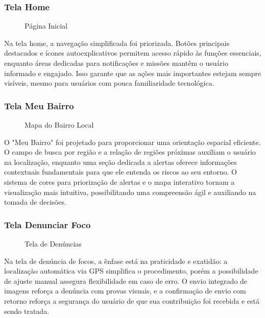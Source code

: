 \documentclass[a5paper, 12pt]{article}
\begin{document}
\subsubsection{Tela Home}

\begin{figure}[H]
  \centering
  \caption{Página Inicial}
  \label{fig:home}
\end{figure}

Na tela home, a navegação simplificada foi priorizada. Botões principais destacados e ícones autoexplicativos permitem acesso rápido às funções essenciais, enquanto áreas dedicadas para notificações e missões mantêm o usuário informado e engajado. Isso garante que as ações mais importantes estejam sempre visíveis, mesmo para usuários com pouca familiaridade tecnológica.

\subsubsection{Tela Meu Bairro}

\begin{figure}[H]
  \centering
  \caption{Mapa do Bairro Local}
  \label{fig:bairro}
\end{figure}

O "Meu Bairro" foi projetado para proporcionar uma orientação espacial eficiente.  O campo de busca por região e a relação de regiões próximas auxiliam o usuário na localização, enquanto uma seção dedicada a alertas oferece informações contextuais fundamentais para que ele entenda os riscos ao seu entorno.  O sistema de cores para priorização de alertas e o mapa interativo tornam a visualização mais intuitiva, possibilitando uma compreensão ágil e auxiliando na tomada de decisões.

\subsubsection{Tela Denunciar Foco}

\begin{figure}[H]
  \centering
  \caption{Tela de Denúncias}
  \label{fig:denuncia}
\end{figure}

Na tela de denúncia de focos, a ênfase está na praticidade e exatidão: a localização automática via GPS simplifica o procedimento, porém a possibilidade de ajuste manual assegura flexibilidade em caso de erro.  O envio integrado de imagens reforça a denúncia com provas visuais, e a confirmação de envio com retorno reforça a segurança do usuário de que sua contribuição foi recebida e está sendo tratada.
\end{document}

